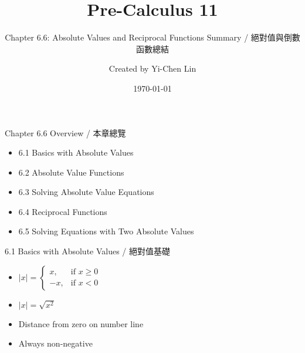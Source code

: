 \documentclass[aspectratio=169]{beamer}
\title{Pre-Calculus 11}
\subtitle{Chapter 6.6: Absolute Values and Reciprocal Functions Summary / 絕對值與倒數函數總結}
\author{Created by Yi-Chen Lin}
\date{\today}
\begin{document}
\begin{frame}
    \titlepage
\end{frame}

\begin{frame}{Chapter 6.6 Overview / 本章總覽}
    \begin{tcolorbox}[colback=lightgray,colframe=primary,title=Topics Covered]
        \footnotesize
        \begin{itemize}
            \item 6.1 Basics with Absolute Values
            \item 6.2 Absolute Value Functions
            \item 6.3 Solving Absolute Value Equations
            \item 6.4 Reciprocal Functions
            \item 6.5 Solving Equations with Two Absolute Values
        \end{itemize}
    \end{tcolorbox}
\end{frame}

\begin{frame}{6.1 Basics with Absolute Values / 絕對值基礎}
    \begin{tcolorbox}[colback=lightgray,colframe=primary,title=Key Points]
        \footnotesize
        \begin{itemize}
            \item $|x| = \begin{cases} x, & \text{if } x \geq 0 \\ -x, & \text{if } x < 0 \end{cases}$
            \item $|x| = \sqrt{x^2}$
            \item Distance from zero on number line
            \item Always non-negative
        \end{itemize}
    \end{tcolorbox}
    \vspace{0.5em}
    \begin{center}
    \end{center}
\end{frame}
\end{document}
